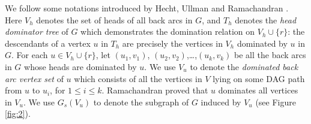 \documentclass[11pt]{article}
\begin{document}
We follow some notations introduced by Hecht, Ullman \cite{HecU1, HecU2} and Ramachandran \cite{Rama1,Rama2}. Here $V_h$ denotes the set of heads of all back arcs in $G$, and $T_h$ denotes the \emph{head dominator tree} of $G$ which demonstrates the domination relation on $V_h\cup \{r\}$: the descendants of a vertex $u$ in $T_h$ are precisely the vertices in $V_h$ dominated by $u$ in $G$. For each $u\in V_h\cup\{r\}$, let $(u_1,v_1)$, $(u_2,v_2)$,\dots,$(u_k,v_k)$ be all the back arcs in $G$ whose heads are dominated by $u$. We use $V_u$ to denote the \emph{dominated back arc vertex set} of $u$ which consists of all the vertices in $V$ lying on some DAG path from $u$ to $u_i$, for $1\leq i\leq k$. Ramachandran \cite{Rama1,Rama2} proved that $u$ dominates all vertices in $V_u$. We use $G_s(V_u)$ to denote the subgraph of $G$ induced by $V_u$ (see Figure \ref{fig:2}).
\end{document}
